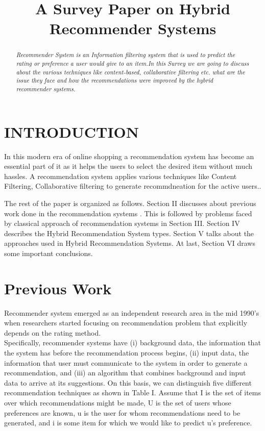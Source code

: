 \documentclass[conference]{IEEEtran}
\begin{document}
\title{ A Survey Paper on Hybrid Recommender Systems}
\author{}
\maketitle
\begin{abstract}
\em
Recommender System is an Information filtering system that is used to predict the rating or preference a user would give to an item.In this Survey we are going to discuss about the various techniques like content-based, collaborative filtering etc. what are the issue they face and how the recommendations were improved by the hybrid recommender systems.
\end{abstract}

\section{INTRODUCTION}
In this modern era of online shopping a recommendation system 
has become an essential part of it as it helps the users to select the desired item without much hassles. A recommendation system applies various techniques like Content Filtering, Collaborative filtering to generate recommdneation for the active users.\cite{paper1}.
 
  The rest of the paper is organized as follows. Section II discusses about previous work done in the recommendation systems . This is followed by problems faced by classical approach of recommendation systems in Section III. Section IV describes the Hybrid Recommendation System types. Section V talks about the approaches used in Hybrid Recommendation Systems. At last, Section VI draws some important conclusions.

\section{Previous Work}
	Recommender system emerged as an independent research area in the mid 1990’s when researchers started focusing on recommendation problem that explicitly depends on the rating method.\\
	Specifically, recommender systems have (i) background data, the information that the
system has before the recommendation process begins, (ii) input data, the information that user must communicate to
the system in order to generate a recommendation, and (iii) an algorithm that combines background and input data to
arrive at its suggestions. On this basis, we can distinguish five different recommendation techniques as shown in
Table I. Assume that I is the set of items over which recommendations might be made, U is the set of users whose
preferences are known, u is the user for whom recommendations need to be generated, and i is some item for which
we would like to predict u’s preference.\cite{paper1}
\end{document}
